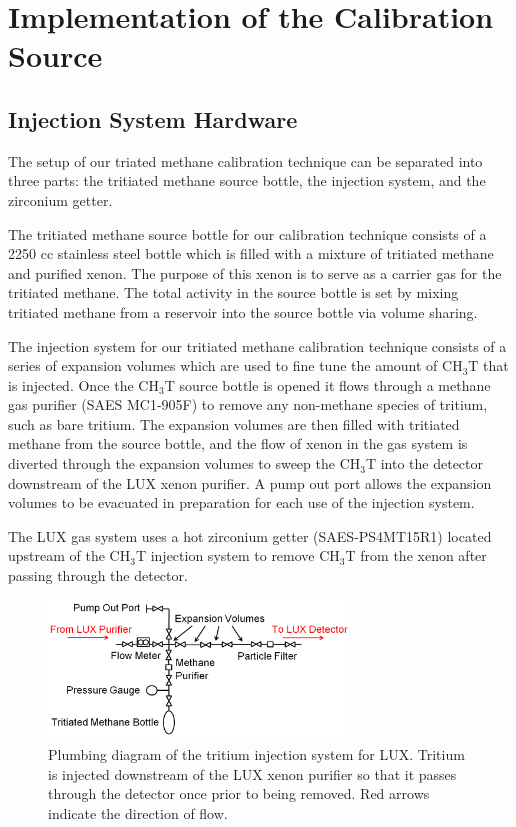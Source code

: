 \section{Implementation of the Calibration Source}

\subsection{Injection System Hardware}

The setup of our triated methane calibration technique can be separated into three parts: the tritiated methane source bottle, the injection system,  and the zirconium getter.

The tritiated methane source bottle for our calibration technique consists of a 2250 cc stainless steel bottle which is filled with a mixture of tritiated methane and purified xenon.  The purpose of this xenon is to serve as a carrier gas for the tritiated methane.  The total activity in the source bottle is set by mixing tritiated methane from a reservoir into the source bottle via volume sharing.

The injection system for our tritiated methane calibration technique consists of a series of expansion volumes which are used to fine tune the amount of CH$_3$T that is injected.  Once the CH$_3$T source bottle is opened it flows through a methane gas purifier (SAES MC1-905F) to remove any non-methane species of tritium, such as bare tritium. The expansion volumes are then filled with tritiated methane from the source bottle, and the flow of xenon in the gas system is diverted through the expansion volumes to sweep the CH$_3$T into the detector downstream of the LUX xenon purifier.  A pump out port allows the expansion volumes to be evacuated in preparation for each use of the injection system.  

The LUX gas system uses a hot zirconium getter (SAES-PS4MT15R1) located upstream of the CH$_3$T injection system to remove CH$_3$T from the xenon after passing through the detector.  

\begin{figure}[H]\centering
\includegraphics[width=80mm]{TritiumPlumbing.png}
\caption{Plumbing diagram of the tritium injection system for LUX.  Tritium is injected downstream of the LUX xenon purifier so that it passes through the detector once prior to being removed.  Red arrows indicate the direction of flow.}
\label{fig:Removal}
\end{figure}

